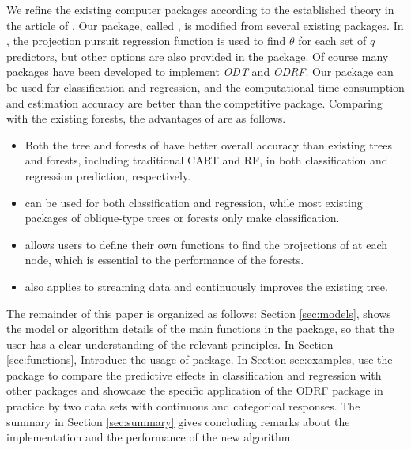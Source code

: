 \documentclass[nojss]{jss}
\numberwithin{equation}{section}
\begin{document}
We refine the existing computer   \citep{R} packages according to the established theory in the article of \cite{zhan2022consistency}. Our package, called , is modified from several existing  packages.
In , the projection pursuit regression function is used to find $ \theta $ for each set of $ q $ predictors, but other options are also provided in the package. Of course many   packages have been developed  to implement \emph{ODT} and \emph{ODRF}.
Our   package can be used for classification and regression, and the computational time consumption and estimation accuracy are better than the competitive  package. Comparing with the existing forests, the advantages of  are as follows.
\begin{itemize}

\item Both the tree and forests of  have better overall accuracy than existing trees and forests, including traditional CART and RF, in both classification and regression prediction, respectively.


\item {} can be used for both classification and regression, while most existing packages of oblique-type trees or forests only make classification.

\item {} allows users to define their own functions to find the projections of at each node, which is essential to the performance of the forests.

\item {} also applies to streaming data and continuously improves the existing tree.

\end{itemize}


The remainder of this paper is organized as follows: Section \ref{sec:models}, shows the model or algorithm details of the main functions in the  package, so that the user has a clear understanding of the relevant principles. In Section \ref{sec:functions}, Introduce the usage of  package. In Section {sec:examples}, use the  package to compare the predictive effects in classification and regression with other  packages and showcase the specific application of the ODRF package in practice by two data sets with continuous and categorical responses. The summary in Section \ref{sec:summary} gives concluding remarks about the implementation and the performance of the new algorithm.
\end{document}
